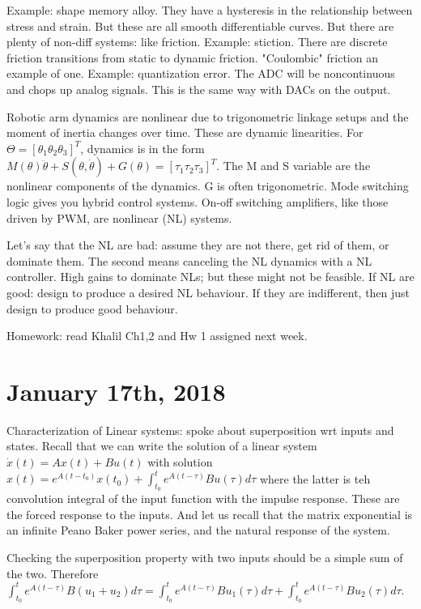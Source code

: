 \documentclass[11pt]{article}
\begin{document}
Example: shape memory alloy. They have a hysteresis in the relationship between stress and strain. But these are all smooth differentiable curves. But there are plenty of non-diff systems: like friction. Example: stiction. There are discrete friction transitions from static to dynamic friction. "Coulombic" friction an example of one. Example: quantization error. The ADC will be noncontinuous and chops up analog signals. This is the same way with DACs on the output. 

Robotic arm dynamics are nonlinear due to trigonometric linkage setups and the moment of inertia changes over time. These are dynamic linearities. For $\Theta = [ \theta_1 \theta_2 \theta_3 ]^T$, dynamics is in the form $M(\theta)\ddot{\theta} + S(\theta,\dot{\theta}) + G(\theta) = [\tau_1 \tau_2 \tau_3]^T$. The M and S variable are the nonlinear components of the dynamics. G is often trigonometric. Mode switching logic gives you hybrid control systems. On-off switching amplifiers, like those driven by PWM, are nonlinear (NL) systems.

Let's say that the NL are bad: assume they are not there, get rid of them, or dominate them. The second means canceling the NL dynamics with a NL controller. High gains to dominate NLs; but these might not be feasible. If NL are good: design to produce a desired NL behaviour. If they are indifferent, then just design to produce good behaviour. 

Homework: read Khalil Ch1,2 and Hw 1 assigned next week.



\section*{January 17th, 2018}
Characterization of Linear systems: spoke about superposition wrt inputs and states. Recall that we can write the solution of a linear system $\dot{x}(t)= Ax(t) + Bu(t)$ with solution $x(t) = e^{A(t-t_0)}x(t_0) + \int_{t_0}^t e^{A(t-\tau)}Bu(\tau)d\tau$ where the latter is teh convolution integral of the input function with the impulse response. These are the forced response to the inputs. And let us recall that the matrix exponential is an infinite Peano Baker power series, and the natural response of the system.

Checking the superposition property with two inputs should be a simple sum of the two. Therefore $\int_{t_0}^t e^{A(t-\tau)}B(u_1 + u_2)d\tau = \int_{t_0}^t e^{A(t-\tau)}Bu_1(\tau)d\tau + \int_{t_0}^t e^{A(t-\tau)}Bu_2(\tau)d\tau$. 
\end{document}
